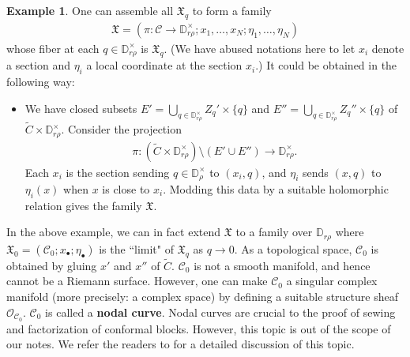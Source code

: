 \documentclass[12pt,a4paper,notitlepage]{article}
\theoremstyle{definition}
\newtheorem{eg}[df]{Example}
\theoremstyle{plain}
\newcommand{\fk}{\mathfrak}
\newcommand{\mc}{\mathcal}
\newcommand{\wtd}{\widetilde}
\newcommand{\scr}{\mathscr}
\newcommand{\blt}{\bullet}
\newcommand{\Dbb}{\mathbb D}
\numberwithin{equation}{section}
\begin{document}
\begin{eg}
One can assemble all $\fk X_q$ to form a family
\begin{align*}
\fk X=(\pi:\mc C\rightarrow\Dbb_{r\rho}^\times;x_1,\dots,x_N;\eta_1,\dots,\eta_N)
\end{align*}
whose fiber at each $q\in\Dbb_{r\rho}^\times$ is $\fk X_q$. (We have abused notations here to let $x_i$ denote a section and $\eta_i$ a local coordinate at the section $x_i$.) It could be obtained in the following way:
\begin{itemize}
\item We have closed subsets $E'=\bigcup_{q\in\Dbb_{r\rho}^\times} Z_q'\times \{q\}$ and $E''=\bigcup_{q\in\Dbb_{r\rho}^\times} Z_q''\times\{q\}$ of $\wtd C\times\Dbb_{r\rho}^\times$. Consider the projection
\begin{align*}
\pi: (\wtd C\times\Dbb_{r\rho}^\times)\setminus (E'\cup E'')\rightarrow \Dbb_{r\rho}^\times.
\end{align*}
Each $x_i$ is the section sending $q\in\Dbb_{\rho}^\times$ to $(x_i,q)$, and $\eta_i$ sends $(x,q)$ to $\eta_i(x)$ when $x$ is close to $x_i$. Modding this data by a suitable holomorphic relation gives the family $\fk X$.
\end{itemize}
\hfill \qedsymbol
\end{eg}

In the above example, we can in fact extend $\fk X$ to a family over $\Dbb_{r\rho}$ where $\fk X_0=(\mc C_0;x_\blt;\eta_\blt)$ is the ``limit" of $\fk X_q$ as $q\rightarrow0$. As a topological space, $\mc C_0$ is obtained by gluing $x'$ and $x''$ of $\wtd C$. $\mc C_0$ is not a smooth manifold, and hence cannot be a Riemann surface. However, one can make $\mc C_0$ a singular complex manifold (more precisely: a complex space) by defining a suitable structure sheaf $\scr O_{\mc C_0}$. $\mc C_0$ is called a \textbf{nodal curve}. Nodal curves are crucial to the proof of sewing and factorization of conformal blocks. However, this topic is out of the scope of our notes. We refer the readers to \cite{Gui} for a detailed discussion of this topic.






\subsection{}
\end{document}
